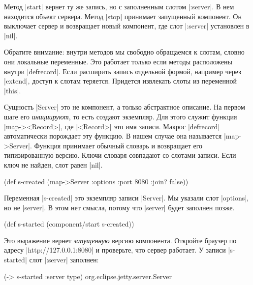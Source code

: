 Метод \spverb|start| вернет ту же запись, но с заполненным слотом
\spverb|:server|. В нем находится объект сервера. Метод \spverb|stop| принимает
запущенный компонент. Он выключает сервер и возвращает новый компонент, где слот
\spverb|:server| установлен в \spverb|nil|.

Обратите внимание: внутри методов мы свободно обращаемся к слотам, словно они
локальные переменные. Это работает только если методы расположены внутри
\spverb|defrecord|. Если расширить запись отдельной формой, например через
\spverb|extend|, доступ к слотам теряется. Придется извлекать слоты из
переменной \spverb|this|.

Сущность \spverb|Server| это не компонент, а только абстрактное описание. На
первом шаге его \emph{инициируют}, то есть создают экземпляр. Для этого служит
функция \spverb|map-><Record>|, где \spverb|<Record>| это имя записи. Макрос
\spverb|defrecord| автоматически порождает эту функцию. В нашем случае она
называется \spverb|map->Server|. Функция принимает обычный словарь и возвращает
его типизированную версию. Ключи словаря совпадают со слотами записи. Если ключ
не найден, слот равен \spverb|nil|.

\begin{english}
  \begin{clojure}
(def s-created
  (map->Server
   {:options {:port 8080 :join? false}}))
  \end{clojure}
\end{english}

Переменная \spverb|s-created| это экземпляр записи \spverb|Server|. Мы указали
слот \spverb|options|, но не \spverb|server|. В этом нет смысла, потому что
\spverb|server| будет заполнен позже.

\begin{english}
  \begin{clojure}
(def s-started (component/start s-created))
  \end{clojure}
\end{english}

Это выражение вернет \emph{запущенную} версию компонента. Откройте браузер по
адресу \spverb|http://127.0.0.1:8080| и проверьте, что сервер работает. У записи
\spverb|s-started| слот \spverb|:server| заполнен:

\begin{english}
  \begin{clojure}
(-> s-started :server type)
org.eclipse.jetty.server.Server
  \end{clojure}
\end{english}

